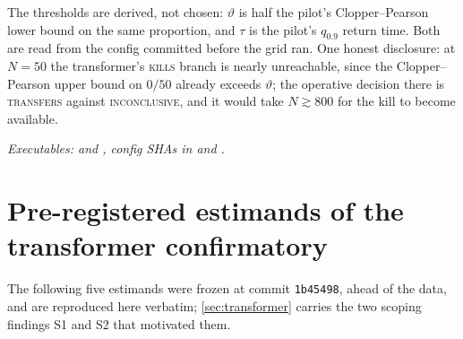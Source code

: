 \documentclass[11pt]{article}
\theoremstyle{definition}
\theoremstyle{remark}
\begin{document}
\noindent The thresholds are derived, not chosen: $\vartheta$ is half the pilot's
Clopper--Pearson lower bound on the same proportion, and $\tau$ is the pilot's
$q_{0.9}$ return time. Both are read from the config committed before the grid
ran. One honest disclosure: at $N=50$ the transformer's \textsc{kills} branch is
nearly unreachable, since the Clopper--Pearson upper bound on $0/50$ already
exceeds $\vartheta$; the operative decision there is
\textsc{transfers} against \textsc{inconclusive}, and it would take $N\gtrsim800$
for the kill to become available.

\noindent\textit{Executables:
 and
, config SHAs in
 and
.}

\section{Pre-registered estimands of the transformer confirmatory}\label{app:estimands}

The following five estimands were frozen at commit \texttt{1b45498}, ahead of the
data, and are reproduced here verbatim; \cref{sec:transformer} carries the two
scoping findings S1 and S2 that motivated them.
\end{document}
